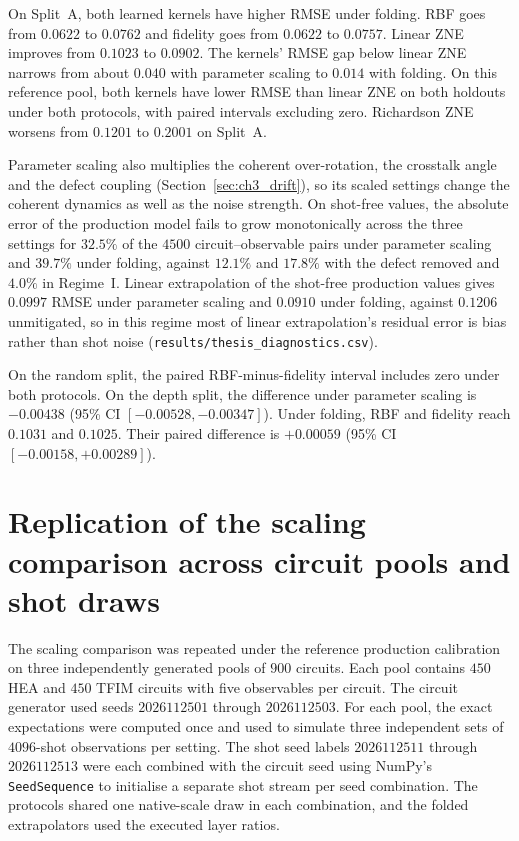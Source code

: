 \documentclass[Thesis.tex]{subfiles}
\begin{document}
On Split~A, both learned kernels have higher RMSE under folding.
RBF goes from $0.0622$ to $0.0762$ and fidelity goes from $0.0622$
to $0.0757$. Linear ZNE improves from $0.1023$ to $0.0902$.
The kernels' RMSE gap below linear ZNE narrows from about $0.040$
with parameter scaling to $0.014$ with folding. On this reference pool,
both kernels have lower RMSE than linear ZNE on both holdouts under
both protocols, with paired intervals excluding zero. Richardson ZNE worsens from $0.1201$
to $0.2001$ on Split~A.

Parameter scaling also multiplies the coherent over-rotation, the crosstalk angle and
the defect coupling (Section~\ref{sec:ch3_drift}), so its scaled settings change the
coherent dynamics as well as the noise strength. On shot-free values, the absolute
error of the production model fails to grow monotonically across the three settings
for $32.5\%$ of the $4500$ circuit--observable pairs under parameter scaling and
$39.7\%$ under folding, against $12.1\%$ and $17.8\%$ with the defect removed and
$4.0\%$ in Regime~I. Linear extrapolation of the shot-free production values gives
$0.0997$ RMSE under parameter scaling and $0.0910$ under folding, against $0.1206$
unmitigated, so in this regime most of linear extrapolation's residual error is bias
rather than shot noise (\texttt{results/thesis\_diagnostics.csv}).

On the random split, the paired RBF-minus-fidelity interval includes zero
under both protocols. On the depth split, the difference
under parameter scaling is $-0.00438$ (95\% CI $[-0.00528,\allowbreak -0.00347]$).
Under folding, RBF and fidelity reach $0.1031$ and $0.1025$.
Their paired difference is $+0.00059$ (95\% CI
$[-0.00158,\allowbreak +0.00289]$).

\section{Replication of the scaling comparison across circuit pools and shot draws}
\label{sec:ch5_folding_seeds}

The scaling comparison was repeated under the reference production calibration on
three independently generated pools of $900$ circuits. Each pool contains
$450$ HEA and $450$ TFIM circuits with five observables per circuit. The
circuit generator used seeds $2026112501$ through $2026112503$. For each pool,
the exact expectations were computed once and used to simulate three
independent sets of $4096$-shot observations per setting. The shot seed labels
$2026112511$ through $2026112513$ were each combined with the circuit seed
using NumPy's \texttt{SeedSequence} to initialise a separate shot stream per
seed combination. The protocols shared one native-scale draw in each
combination, and the folded extrapolators used the executed layer ratios.
\end{document}
